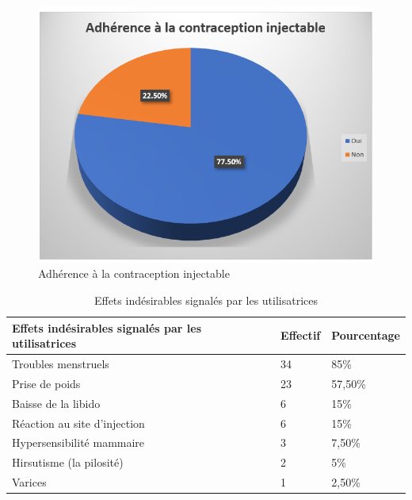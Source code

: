 \begin{figure}[H]
  \centering
  \includegraphics{Images/fig_53.png}
  \caption{Adhérence à la contraception injectable}
  
\end{figure}

\begin{table}[H]
  \centering
  \renewcommand{\arraystretch}{1.5}
  \caption{Effets indésirables signalés par les utilisatrices}
  \begin{spacing}{1.5} %
  \begin{tabularx}{\textwidth}{|p{8cm}|X|X|}
      \hline
      \rowcolor{customcolor}
      \textbf{\color{white}Effets indésirables signalés \newline par les utilisatrices} & \textbf{\color{white}Effectif} & \textbf{\color{white}Pourcentage}  \\
      \hline
      Troubles menstruels & 34 & 85\% \\
      \hline
      Prise de poids   & 23 & 57,50\% \\
      \hline
      Baisse de la libido & 6 & 15\% \\
      \hline
      Réaction au site d’injection & 6 & 15\% \\
      \hline
      Hypersensibilité mammaire & 3 & 7,50\% \\
      \hline
      Hirsutisme (la pilosité) & 2 & 5\% \\
      \hline
      Varices & 1 & 2,50\% \\
      
      \hline
  \end{tabularx}
\end{spacing}

\end{table}

